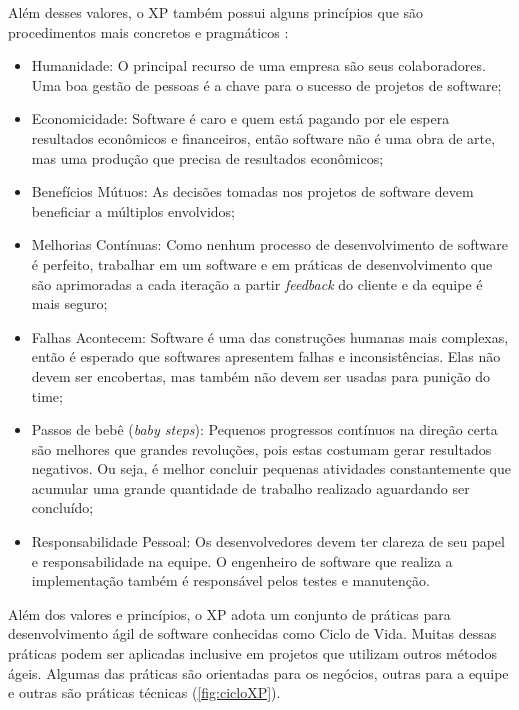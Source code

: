         Além desses valores, o XP também possui alguns princípios que são procedimentos mais concretos e pragmáticos \cite{Valente2020}:
        \begin{itemize}
            \item Humanidade: O principal recurso de uma empresa são seus colaboradores. Uma boa gestão de pessoas é a chave para o sucesso de projetos de software;
            \item Economicidade: Software é caro e quem está pagando por ele espera resultados econômicos e financeiros, então software não é uma obra de arte, mas uma produção que precisa de resultados econômicos;
            \item Benefícios Mútuos: As decisões tomadas nos projetos de software devem beneficiar a múltiplos envolvidos;
            \item Melhorias Contínuas: Como nenhum processo de desenvolvimento de software é perfeito, trabalhar em um software e em práticas de desenvolvimento que são aprimoradas a cada iteração a partir \emph{feedback} do cliente e da equipe é mais seguro;
            \item Falhas Acontecem: Software é uma das construções humanas mais complexas, então é esperado que softwares apresentem falhas e inconsistências. Elas não devem ser encobertas, mas também não devem ser usadas para punição do time;
            \item Passos de bebê (\emph{baby steps}): Pequenos progressos contínuos na direção certa são melhores que grandes revoluções, pois estas costumam gerar resultados negativos. Ou seja, é melhor concluir pequenas atividades constantemente que acumular uma grande quantidade de trabalho realizado aguardando ser concluído;
            \item Responsabilidade Pessoal: Os desenvolvedores devem ter clareza de seu papel e responsabilidade na equipe. O engenheiro de software que realiza a implementação também é responsável pelos testes e manutenção.
        \end{itemize}
        
        Além dos valores e princípios, o XP adota um conjunto de práticas para desenvolvimento ágil de software conhecidas como Ciclo de Vida. Muitas dessas práticas podem ser aplicadas inclusive em projetos que utilizam outros métodos ágeis. Algumas das práticas são orientadas para os negócios, outras para a equipe e outras são práticas técnicas (\autoref{fig:cicloXP}).
        
